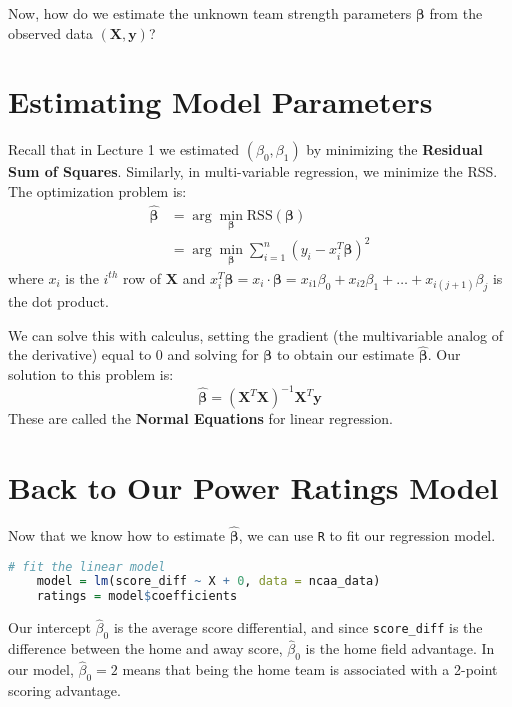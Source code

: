 \documentclass[twoside]{article}
\theoremstyle{definition}
\begin{document}
Now, how do we estimate the unknown team strength parameters $\boldsymbol{\beta}$ from the observed data $(\mathbf{X}, \mathbf{y})$?

\section{Estimating Model Parameters}

Recall that in Lecture 1 we estimated $(\beta_0, \beta_1)$ by minimizing the \textbf{Residual Sum of Squares}. Similarly, in multi-variable regression, we minimize the RSS. The optimization problem is:
\begin{align}
    \widehat{\boldsymbol{\beta}} &= \arg\min_{\boldsymbol{\beta}} \text{RSS}(\boldsymbol{\beta}) \nonumber \\
    &= \arg\min_{\boldsymbol{\beta}} \sum_{i=1}^{n} (y_i - x_i^T \boldsymbol{\beta})^2
\end{align}
where $x_i$ is the $i^{th}$ row of $\mathbf{X}$ and $x_i^T \boldsymbol{\beta} = x_i \cdot \boldsymbol{\beta} = x_{i1} \beta_0 + x_{i2} \beta_1 + \hdots + x_{i(j+1)} \beta_j$ is the dot product.

We can solve this with calculus, setting the gradient (the multivariable analog of the derivative) equal to 0 and solving for $\boldsymbol{\beta}$ to obtain our estimate $\widehat{\boldsymbol{\beta}}$. Our solution to this problem is:
\begin{equation}
    \widehat{\boldsymbol{\beta}} = (\mathbf{X}^T \mathbf{X})^{-1} \mathbf{X}^T \mathbf{y}
    \label{eq:normal-equations}
\end{equation}
These are called the \textbf{Normal Equations} for linear regression.

\section{Back to Our Power Ratings Model}

Now that we know how to estimate $\widehat{\boldsymbol{\beta}}$, we can use \texttt{R} to fit our regression model.
\begin{lstlisting}[language=R]
    # fit the linear model
    model = lm(score_diff ~ X + 0, data = ncaa_data)
    ratings = model$coefficients
\end{lstlisting}

Our intercept $\widehat{\beta}_0$ is the average score differential, and since \texttt{score\_diff} is the difference between the home and away score, $\widehat{\beta}_0$ is the home field advantage. In our model, $\widehat{\beta}_0 = 2$ means that being the home team is associated with a 2-point scoring advantage.
\end{document}
